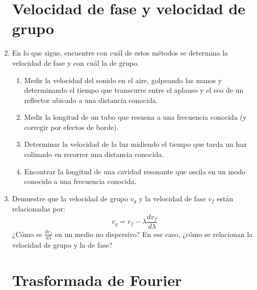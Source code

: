 \documentclass[11pt,spanish,a4paper]{article}
\begin{document}
\begin{enumerate}
\section*{Velocidad de fase y velocidad de grupo}

\item En lo que sigue, encuentre con cuál de estos métodos se determina
 la velocidad de fase y con cuál la de grupo.
\begin{enumerate}
\item Medir la velocidad del sonido en el aire, golpeando las manos y determinando
el tiempo que transcurre entre el aplauso y el eco de un reflector
ubicado a una distancia conocida.
\item Medir la longitud de un tubo que resuena a una frecuencia conocida
(y corregir por efectos de borde).
\item Determinar la velocidad de la luz midiendo el tiempo que tarda un
haz colimado en recorrer una distancia conocida.
\item Encontrar la longitud de una cavidad resonante que oscila en un modo
conocido a una frecuencia conocida.
\end{enumerate}


\item Demuestre que la velocidad de grupo $v_{g}$ y la velocidad de fase
$v_{f}$ están relacionadas por:
\[
v_{g}=v_{f}-\lambda\frac{dv_{f}}{d\lambda}
\]
¿Cómo es $\frac{dv_{f}}{d\lambda}$ en un medio no dispersivo? En
ese caso, ¿cómo se relacionan la velocidad de grupo y la de fase?


\section*{Trasformada de Fourier}


\end{enumerate}
\end{document}
